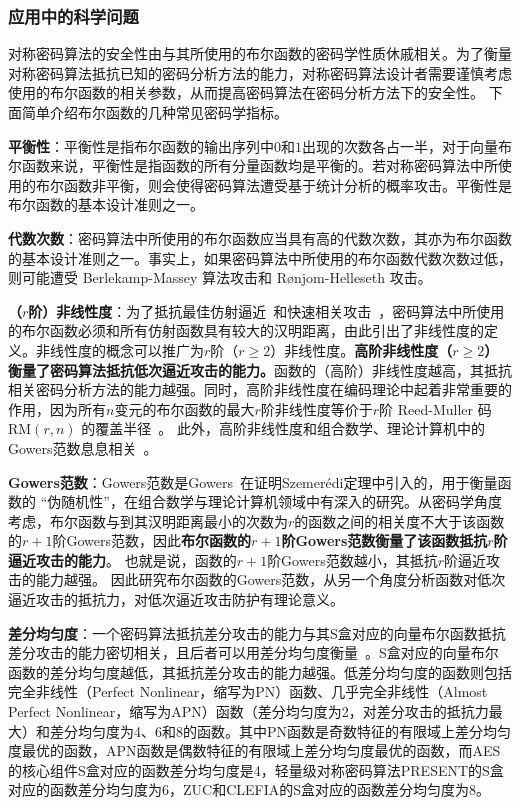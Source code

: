 \documentclass[a4paper,zihao=-4,AutoFakeBold]{ctexart}
\begin{document}
\subsubsection{应用中的科学问题}
对称密码算法的安全性由与其所使用的布尔函数的密码学性质休戚相关。为了衡量对称密码算法抵抗已知的密码分析方法的能力，对称密码算法设计者需要谨慎考虑使用的布尔函数的相关参数，从而提高密码算法在密码分析方法下的安全性。
下面简单介绍布尔函数的几种常见密码学指标。

\textbf{平衡性}：平衡性是指布尔函数的输出序列中$0$和$1$出现的次数各占一半，对于向量布尔函数来说，平衡性是指函数的所有分量函数均是平衡的。若对称密码算法中所使用的布尔函数非平衡，则会使得密码算法遭受基于统计分析的概率攻击。平衡性是布尔函数的基本设计准则之一。

\textbf{代数次数}：密码算法中所使用的布尔函数应当具有高的代数次数，其亦为布尔函数的基本设计准则之一。事实上，如果密码算法中所使用的布尔函数代数次数过低，则可能遭受 Berlekamp-Massey 算法攻击和 Rønjom-Helleseth 攻击。

\textbf{（$r$阶）非线性度}：为了抵抗最佳仿射逼近~\cite{DX1991}和快速相关攻击~\cite{MS-88}，密码算法中所使用的布尔函数必须和所有仿射函数具有较大的汉明距离，由此引出了非线性度的定义。非线性度的概念可以推广为$r$阶（$r\ge 2$）非线性度。\textbf{高阶非线性度（$r\ge 2$）衡量了密码算法抵抗低次逼近攻击的能力。}函数的（高阶）非线性度越高，其抵抗相关密码分析方法的能力越强。同时，高阶非线性度在编码理论中起着非常重要的作用，因为所有$n$变元的布尔函数的最大$r$阶非线性度等价于$r$阶 Reed-Muller 码 $\mathrm{RM}(r, n)$ 的覆盖半径~\cite{CHLL97}。
此外，高阶非线性度和组合数学、理论计算机中的Gowers范数息息相关~\cite{Gowers1998A}。
\label{sec:higher_order_nl}

\textbf{Gowers范数}：Gowers范数是Gowers~\cite{Gowers1998A}在证明Szemer\'edi定理中引入的，用于衡量函数的 ``伪随机性''，在组合数学与理论计算机领域中有深入的研究。从密码学角度考虑，布尔函数与到其汉明距离最小的次数为$r$的函数之间的相关度不大于该函数的$r+1$阶Gowers范数，因此\textbf{布尔函数的$r+1$阶Gowers范数衡量了该函数抵抗$r$阶逼近攻击的能力}。
也就是说，函数的$r+1$阶Gowers范数越小，其抵抗$r$阶逼近攻击的能力越强。
因此研究布尔函数的Gowers范数，从另一个角度分析函数对低次逼近攻击的抵抗力，对低次逼近攻击防护有理论意义。

\textbf{差分均匀度}：一个密码算法抵抗差分攻击的能力与其S盒对应的向量布尔函数抵抗差分攻击的能力密切相关，且后者可以用差分均匀度衡量~\cite{Nyberg1991PN}。S盒对应的向量布尔函数的差分均匀度越低，其抵抗差分攻击的能力越强。低差分均匀度的函数则包括完全非线性（Perfect Nonlinear，缩写为PN）函数、几乎完全非线性（Almost Perfect Nonlinear，缩写为APN）函数（差分均匀度为2，对差分攻击的抵抗力最大）和差分均匀度为4、6和8的函数。其中PN函数是奇数特征的有限域上差分均匀度最优的函数，APN函数是偶数特征的有限域上差分均匀度最优的函数，而AES的核心组件S盒对应的函数差分均匀度是4，轻量级对称密码算法PRESENT的S盒对应的函数差分均匀度为6，ZUC和CLEFIA的S盒对应的函数差分均匀度为8。
\end{document}
